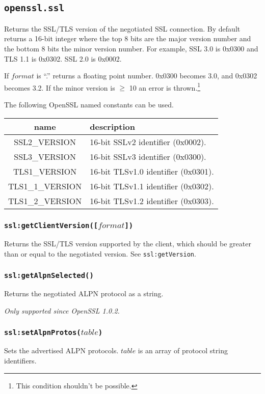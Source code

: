 \documentclass[11pt, oneside]{memoir}
\newcommand*{\fn}[1]{\texttt{#1}\xspace}
\newcounter{toccols}
\newenvironment{Module}[1]{
	\subsection{\texttt{#1}}
	\addtocontents{toc}{
		\protect\begin{multicols}{\value{toccols}}
	}
}{
	\addtocontents{toc}{\protect\end{multicols}}
}
\begin{document}
\begin{Module}{openssl.ssl}
Returns the SSL/TLS version of the negotiated SSL connection. By default returns a 16-bit integer where the top 8 bits are the major version number and the bottom 8 bits the minor version number. For example, SSL 3.0 is 0x0300 and TLS 1.1 is 0x0302. SSL 2.0 is 0x0002.

If $format$ is ``.'' returns a floating point number. 0x0300 becomes 3.0, and 0x0302 becomes 3.2. If the minor version is $\geq$ 10 an error is thrown.\footnote{This condition shouldn't be possible.}

The following OpenSSL named constants can be used.

\begin{tabular}{ c | l }
name & description \\\hline
SSL2\_VERSION & 16-bit SSLv2 identifier (0x0002).  \\
SSL3\_VERSION & 16-bit SSLv3 identifier (0x0300).  \\
TLS1\_VERSION & 16-bit TLSv1.0 identifier (0x0301).  \\
TLS1\_1\_VERSION & 16-bit TLSv1.1 identifier (0x0302).  \\
TLS1\_2\_VERSION & 16-bit TLSv1.2 identifier (0x0303).  \\
\end{tabular}

\subsubsection[\fn{ssl:getClientVersion}]{\fn{ssl:getClientVersion([$format$])}}

Returns the SSL/TLS version supported by the client, which should be greater than or equal to the negotiated version. See \fn{ssl:getVersion}.

\subsubsection[\fn{ssl:getAlpnSelected}]{\fn{ssl:getAlpnSelected()}}

Returns the negotiated ALPN protocol as a string.

\emph{Only supported since OpenSSL 1.0.2.}

\subsubsection[\fn{ssl:setAlpnProtos}]{\fn{ssl:setAlpnProtos($table$)}}

Sets the advertised ALPN protocols. $table$ is an array of protocol string identifiers.


\end{Module}
\end{document}
